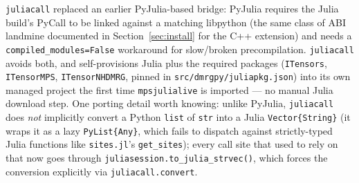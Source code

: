 \documentclass[11pt]{article}
\begin{document}
\texttt{juliacall} replaced an earlier PyJulia-based bridge: PyJulia
requires the Julia build's PyCall to be linked against a matching
libpython (the same class of ABI landmine documented in
Section~\ref{sec:install} for the C++ extension) and needs a
\texttt{compiled\_modules=False} workaround for slow/broken
precompilation. \texttt{juliacall} avoids both, and self-provisions Julia
plus the required packages (\texttt{ITensors}, \texttt{ITensorMPS},
\texttt{ITensorNHDMRG}, pinned in \texttt{src/dmrgpy/juliapkg.json}) into
its own managed project the first time \texttt{mpsjulialive} is imported
--- no manual Julia download step. One porting detail worth knowing:
unlike PyJulia, \texttt{juliacall} does \emph{not} implicitly convert a
Python \texttt{list} of \texttt{str} into a Julia \texttt{Vector\{String\}}
(it wraps it as a lazy \texttt{PyList\{Any\}}, which fails to dispatch
against strictly-typed Julia functions like \texttt{sites.jl}'s
\texttt{get\_sites}); every call site that used to rely on that now goes
through \texttt{juliasession.to\_julia\_strvec()}, which forces the
conversion explicitly via \texttt{juliacall.convert}.
\end{document}
